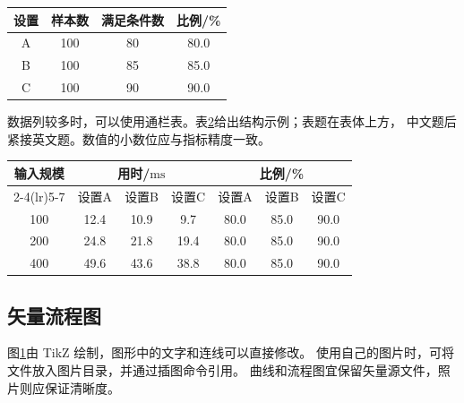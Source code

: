 \begin{table}[!htbp]
  \centering\small
  \label{tab:demo}
  \begin{tabular*}{\columnwidth}{@{\extracolsep{\fill}}cccc@{}}
    \toprule
    设置 & 样本数 & 满足条件数 & 比例/\% \\
    \midrule
    A & 100 & 80 & 80.0 \\
    B & 100 & 85 & 85.0 \\
    C & 100 & 90 & 90.0 \\
    \bottomrule
  \end{tabular*}
\end{table}

数据列较多时，可以使用通栏表。表\ref{tab:wide}给出结构示例；表题在表体上方，
中文题后紧接英文题。数值的小数位应与指标精度一致。

\begin{table}[!t]
  \centering\small
  \label{tab:wide}
  \begin{tabular*}{\textwidth}{@{\extracolsep{\fill}}ccccccc@{}}
    \toprule
    \multirow{2}{*}{输入规模} & \multicolumn{3}{c}{用时/\(\mathrm{ms}\)} &
      \multicolumn{3}{c}{比例/\%} \\
    \cmidrule(lr){2-4}\cmidrule(lr){5-7}
      & 设置A & 设置B & 设置C & 设置A & 设置B & 设置C \\
    \midrule
    100 & 12.4 & 10.9 & 9.7 & 80.0 & 85.0 & 90.0 \\
    200 & 24.8 & 21.8 & 19.4 & 80.0 & 85.0 & 90.0 \\
    400 & 49.6 & 43.6 & 38.8 & 80.0 & 85.0 & 90.0 \\
    \bottomrule
  \end{tabular*}
\end{table}

\subsection{矢量流程图}
图\ref{fig:workflow}由 TikZ 绘制，图形中的文字和连线可以直接修改。
使用自己的图片时，可将文件放入图片目录，并通过插图命令引用。
曲线和流程图宜保留矢量源文件，照片则应保证清晰度。

\begin{figure}[!htbp]
  \centering
  
  \label{fig:workflow}
\end{figure}

